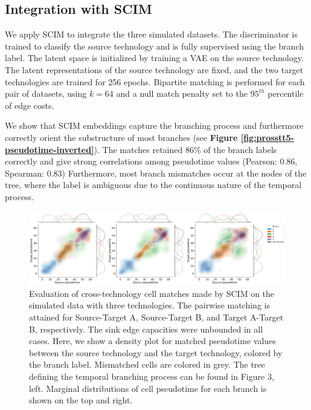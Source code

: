 \subsection{Integration with SCIM}
We apply SCIM to integrate the three simulated datasets.
The discriminator is trained to classify the source technology and is fully supervised using the branch label.
The latent space is initialized by training a VAE on the source technology.
The latent representations of the source technology are fixed,
and the two target technologies are trained for 256 epochs.
Bipartite matching is performed for each pair of datasets,
using $k=64$ and a null match penalty set to the $95^{th}$ percentile of edge costs. 

We show that SCIM embeddings capture the branching process and furthermore correctly orient the substructure of most branches (see \textbf{Figure \ref{fig:prosstt5-pseudotime-inverted}}). 
The matches retained 86\% of the branch labels correctly and give strong correlations among pseudotime values (Pearson: 0.86, Spearman: 0.83)
Furthermore, most branch mismatches occur at the nodes of the tree, where the label is ambiguous due to the continuous nature of the temporal process.

\begin{figure}[htb]
    \centering
    \includegraphics[width=1\textwidth]{figures/integration/3tech-pseudotime-kde.png}
    \caption{
    Evaluation of cross-technology cell matches made by SCIM on the simulated data with three technologies. 
    The pairwise matching is attained for Source-Target A, Source-Target B, and Target A-Target B, respectively. The sink edge capacities were unbounded in all cases.
    Here, we show a density plot for matched pseudotime values between the source technology and the target technology,
    colored by the branch label. Mismatched cells are colored in grey.
    The tree defining the temporal branching process can be found in Figure 3, left.
    Marginal distributions of cell pseudotime for each branch is shown on the top and right.
    }
    \label{fig:prosstt5-3tech-pseudotime}
\end{figure}

